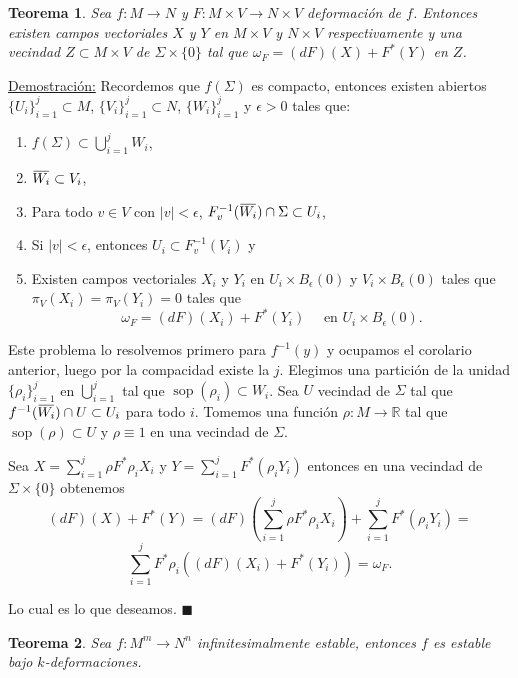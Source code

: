 \documentclass{report}
\newtheorem{theorem}{Teorema}[section]
\theoremstyle{definition}
\DeclareMathOperator{\sop}{sop}
\newcommand{\overbar}[1]{\mkern 1.5mu\overline{\mkern-1.5mu#1\mkern-1.5mu}\mkern 1.5mu}
\begin{document}
\begin{theorem}
Sea $f:M \to N$ y $F:M \times V \to N \times V$ deformaci\'on de $f$. Entonces existen campos vectoriales $X$ y $Y$ en $M \times V$ y $N \times V$ respectivamente y una vecindad $Z \subset M \times V$ de $\Sigma \times \{ 0 \}$ tal que $\omega_F = (dF)(X) + F^\ast (Y)$ en $Z$.
\end{theorem}
\underline{Demostraci\'on:} Recordemos que $f(\Sigma)$ es compacto, entonces existen abiertos $\{ U_i \}_{i=1}^j \subset M$, $\{ V_i \}_{i=1}^j \subset N$, $\{ W_i \}_{i=1}^j$ y $\epsilon >0$ tales que: 
\begin{enumerate}
\item $f(\Sigma) \subset \bigcup\limits_{i=1}^j W_i$,
\item $\overbar{W_i} \subset V_i$,
\item Para todo $v \in V$ con $\vert v \vert < \epsilon$, $F_v^{-1}(\overbar{W_i}) \cap \Sigma \subset U_i$,
\item Si $\vert v \vert < \epsilon$, entonces $U_i \subset F_v^{-1} (V_i)$ y
\item Existen campos vectoriales $X_i $ y $Y_i$ en $U_i \times B_\epsilon(0)$ y $V_i \times B_\epsilon (0)$ tales que $\pi_V(X_i) = \pi_V (Y_i) = 0$ tales que $$\omega_F =(dF)(X_i) + F^\ast (Y_i) \quad \text{ en } U_i \times B_\epsilon(0) .$$
\end{enumerate}

Este problema lo resolvemos primero para $f^{-1}(y)$ y ocupamos el corolario anterior, luego por la compacidad existe la $j$. Elegimos una partici\'on de la unidad $\{ \rho_i \}_{i=1}^j$ en $\bigcup\limits_{i=1}^j$ tal que $\sop (\rho_i) \subset W_i$. Sea $U$ vecindad de $\Sigma$ tal que $f^{-1} (\overbar{W_i}) \cap U \subset U_i$ para todo $i$. Tomemos una funci\'on $\rho:M \to \mathbb{R}$ tal que $\sop (\rho) \subset U$ y $\rho \equiv 1$ en una vecindad de $\Sigma$. 

Sea $X = \sum\limits_{i=1}^j \rho F^\ast \rho_i X_i$ y $Y = \sum\limits_{i=1}^j F^\ast (\rho_i Y_i)$ entonces en una vecindad de $\Sigma \times \{0 \}$ obtenemos $$(dF)(X) + F^\ast (Y) = (dF) \left( \sum\limits_{i=1}^j \rho F^\ast \rho_i X_i \right) + \sum\limits_{i=1}^j F^\ast (\rho_i Y_i) =$$ $$\sum\limits_{i=1}^j F^\ast \rho_i ((dF)(X_i) + F^\ast (Y_i)) = \omega_F .$$

Lo cual es lo que deseamos. $\blacksquare$

\begin{theorem}
Sea $f:M^m \to N^n$ infinitesimalmente estable, entonces $f$ es estable bajo $k$-deformaciones.
\end{theorem}
\end{document}
